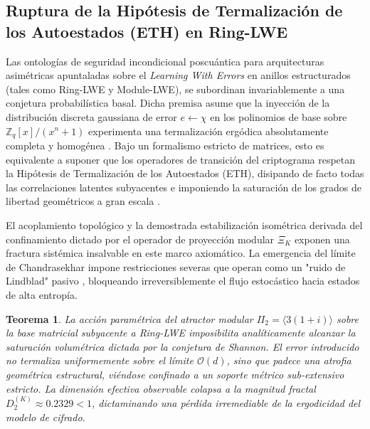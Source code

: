 \documentclass{article}
\numberwithin{equation}{section}
\theoremstyle{plain}
\newtheorem{teorema}{Teorema}[section]
\theoremstyle{definition}
\begin{document}
\subsection{Ruptura de la Hipótesis de Termalización de los Autoestados (ETH) en Ring-LWE}

Las ontologías de seguridad incondicional poscuántica para arquitecturas asimétricas apuntaladas sobre el \textit{Learning With Errors} en anillos estructurados (tales como Ring-LWE y Module-LWE), se subordinan invariablemente a una conjetura probabilística basal. Dicha premisa asume que la inyección de la distribución discreta gaussiana de error $e \gets \chi$ en los polinomios de base sobre $\mathbb{Z}_q[x]/(x^n+1)$ experimenta una termalización ergódica absolutamente completa y homogénea \cite{Peikert2009, Regev2009}. Bajo un formalismo estricto de matrices, esto es equivalente a suponer que los operadores de transición del criptograma respetan la Hipótesis de Termalización de los Autoestados (ETH), disipando de facto todas las correlaciones latentes subyacentes e imponiendo la saturación de los grados de libertad geométricos a gran escala \cite{Pappalardi2023ETH}.

El acoplamiento topológico y la demostrada estabilización isométrica derivada del confinamiento dictado por el operador de proyección modular $\Xi_K$ exponen una fractura sistémica insalvable en este marco axiomático. La emergencia del límite de Chandrasekhar impone restricciones severas que operan como un "ruido de Lindblad" pasivo \cite{Khaymovich2021}, bloqueando irreversiblemente el flujo estocástico hacia estados de alta entropía.

\begin{teorema}
\label{teo:violacion_eth_lwe_uniqueqma}
La acción paramétrica del atractor modular $\Pi_2 = \langle 3(1+i) \rangle$ sobre la base matricial subyacente a Ring-LWE imposibilita analíticamente alcanzar la saturación volumétrica dictada por la conjetura de Shannon. El error introducido no termaliza uniformemente sobre el límite $\mathcal{O}(d)$, sino que padece una atrofia geométrica estructural, viéndose confinado a un soporte métrico sub-extensivo estricto. La dimensión efectiva observable colapsa a la magnitud fractal $D_2^{(K)} \approx 0.2329 < 1$, dictaminando una pérdida irremediable de la ergodicidad del modelo de cifrado.
\end{teorema}
\end{document}
